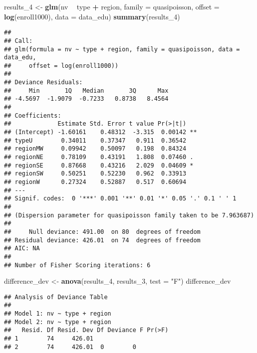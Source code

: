 \documentclass[]{book}
\newenvironment{Shaded}{\begin{snugshade}}{\end{snugshade}}
\newcommand{\DataTypeTok}[1]{\textcolor[rgb]{0.13,0.29,0.53}{#1}}
\newcommand{\DecValTok}[1]{\textcolor[rgb]{0.00,0.00,0.81}{#1}}
\newcommand{\KeywordTok}[1]{\textcolor[rgb]{0.13,0.29,0.53}{\textbf{#1}}}
\newcommand{\NormalTok}[1]{#1}
\newcommand{\OperatorTok}[1]{\textcolor[rgb]{0.81,0.36,0.00}{\textbf{#1}}}
\newcommand{\StringTok}[1]{\textcolor[rgb]{0.31,0.60,0.02}{#1}}
\begin{document}
\begin{Shaded}
\begin{Highlighting}[]
\NormalTok{results_}\DecValTok{4}\NormalTok{ <-}\StringTok{ }\KeywordTok{glm}\NormalTok{(nv }\OperatorTok{~}\StringTok{ }\NormalTok{type }\OperatorTok{+}\StringTok{ }\NormalTok{region, }\DataTypeTok{family =}\NormalTok{ quasipoisson,}
               \DataTypeTok{offset =} \KeywordTok{log}\NormalTok{(enroll1000), }\DataTypeTok{data =}\NormalTok{ data_edu)}
\KeywordTok{summary}\NormalTok{(results_}\DecValTok{4}\NormalTok{)}
\end{Highlighting}
\end{Shaded}

\begin{verbatim}
## 
## Call:
## glm(formula = nv ~ type + region, family = quasipoisson, data = data_edu, 
##     offset = log(enroll1000))
## 
## Deviance Residuals: 
##     Min       1Q   Median       3Q      Max  
## -4.5697  -1.9079  -0.7233   0.8738   8.4564  
## 
## Coefficients:
##             Estimate Std. Error t value Pr(>|t|)   
## (Intercept) -1.60161    0.48312  -3.315  0.00142 **
## typeU        0.34011    0.37347   0.911  0.36542   
## regionMW     0.09942    0.50097   0.198  0.84324   
## regionNE     0.78109    0.43191   1.808  0.07460 . 
## regionSE     0.87668    0.43216   2.029  0.04609 * 
## regionSW     0.50251    0.52230   0.962  0.33913   
## regionW      0.27324    0.52887   0.517  0.60694   
## ---
## Signif. codes:  0 '***' 0.001 '**' 0.01 '*' 0.05 '.' 0.1 ' ' 1
## 
## (Dispersion parameter for quasipoisson family taken to be 7.963687)
## 
##     Null deviance: 491.00  on 80  degrees of freedom
## Residual deviance: 426.01  on 74  degrees of freedom
## AIC: NA
## 
## Number of Fisher Scoring iterations: 6
\end{verbatim}

\begin{Shaded}
\begin{Highlighting}[]
\NormalTok{difference_dev <-}\StringTok{ }\KeywordTok{anova}\NormalTok{(results_}\DecValTok{4}\NormalTok{, results_}\DecValTok{3}\NormalTok{, }\DataTypeTok{test =} \StringTok{"F"}\NormalTok{)}
\NormalTok{difference_dev}
\end{Highlighting}
\end{Shaded}

\begin{verbatim}
## Analysis of Deviance Table
## 
## Model 1: nv ~ type + region
## Model 2: nv ~ type + region
##   Resid. Df Resid. Dev Df Deviance F Pr(>F)
## 1        74     426.01                     
## 2        74     426.01  0        0
\end{verbatim}
\end{document}
